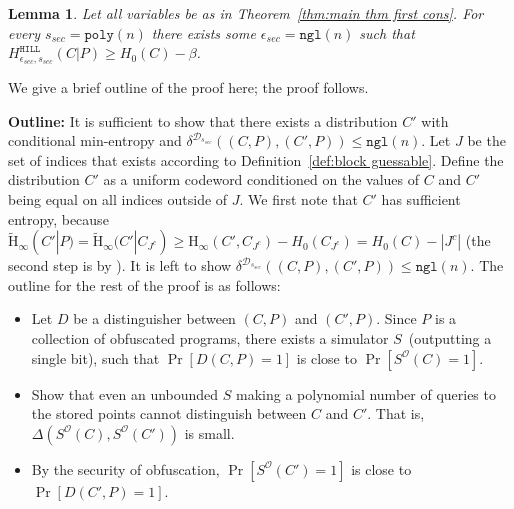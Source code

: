 \documentclass[11pt]{article}
\newcommand{\thref}[1]{\mbox{Theorem~\ref{#1}}}
\newcommand{\defref}[1]{\mbox{Definition~\ref{#1}}}
\newcommand{\hill}{\ensuremath{\mathtt{HILL}}\xspace}
\newcommand{\poly}{\ensuremath{\mathtt{poly}}\xspace}
\newcommand{\ngl}{\ensuremath{\mathtt{ngl}}\xspace}
\newcommand{\Hoo}{\mathrm{H}_\infty}
\newcommand{\Hav}{\tilde{\mathrm{H}}_\infty}
\newtheorem{lemma}[theorem]{Lemma}
\begin{document}
\begin{lemma}
\label{lem:security of cons}
Let all variables be as in \thref{thm:main thm first cons}.  For every $s_{sec} = \poly(n)$ there exists some $\epsilon_{sec} = \ngl(n)$ such that $H^{\hill}_{\epsilon_{sec}, s_{sec}}( C | P ) \geq H_0(C) - \beta$.
\end{lemma}

We give a brief outline of the proof here; the proof follows.

\noindent \textbf{Outline:}  
It is sufficient to show that there exists a distribution $C'$ with conditional min-entropy and $\delta^{\mathcal{D}_{s_{sec}}}((C, P), (C', P))\le \ngl(n)$.  Let $J$ be the set of indices that exists according to \defref{def:block guessable}. Define the distribution $C'$ as a uniform codeword conditioned on the values of $C$ and $C'$ being equal on all indices outside of $J$.  We first note that $C'$ has sufficient entropy, because $\Hav(C' |P) = \Hav(C' | C_{J^c}) \ge \Hoo(C', C_{J^c}) - H_0(C_{J^c})  = H_0(C) - |J^c|$ (the second step is by \cite[Lemma 2.2b]{DBLP:journals/siamcomp/DodisORS08}).  It is left to show $\delta^{\mathcal{D}_{s_{sec}}}((C, P), (C', P)) \le \ngl(n)$.
The outline for the rest of the proof is as follows:
\begin{itemize}
\item Let $D$ be a distinguisher between $(C, P)$ and $(C', P)$. Since $P$ is a collection of obfuscated programs, there exists a simulator $S$~(outputting a single bit), such that $\Pr[D(C, P)=1]$ is close to $\Pr[S^{\mathcal{O}}(C)=1]$.
\item Show that even an unbounded $S$ making a polynomial number of queries to the stored points cannot distinguish between $C$ and $C'$.  That is, $\Delta(S^{\mathcal{O}}(C),S^{\mathcal{O}}(C'))$ is small.
\item By the security of obfuscation, $\Pr[S^{\mathcal{O}}(C')=1]$ is close to $\Pr[D(C', P)=1]$.
\end{itemize}
\end{document}
